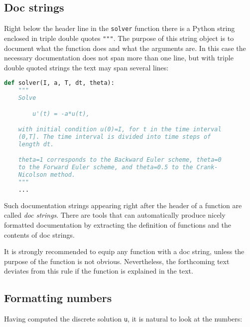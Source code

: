 \documentclass[graybox,sectrefs,envcountresetchap,open=right,final]{svmonodo}
\begin{document}
\subsection{Doc strings}


Right below the header line in the \texttt{solver} function there is a
Python string enclosed in triple double quotes \texttt{"""}.
The purpose of this string object is to document what the function
does and what the arguments are. In this case the necessary
documentation does not span more than one line, but with triple double
quoted strings the text may span several lines:

















\begin{lstlisting}[language=python,style=blue1_bluegreen]
def solver(I, a, T, dt, theta):
    """
    Solve

        u'(t) = -a*u(t),

    with initial condition u(0)=I, for t in the time interval
    (0,T]. The time interval is divided into time steps of
    length dt.

    theta=1 corresponds to the Backward Euler scheme, theta=0
    to the Forward Euler scheme, and theta=0.5 to the Crank-
    Nicolson method.
    """
    ...

\end{lstlisting}

Such documentation strings appearing right after the header of
a function are called \emph{doc strings}. There are tools that can automatically
produce nicely formatted documentation by extracting the definition of
functions and the contents of doc strings.

It is strongly recommended to equip any function with a doc string,
unless the purpose of the function
is not obvious. Nevertheless, the forthcoming
text deviates from this rule if the function is explained in the text.

\subsection{Formatting numbers}

Having computed the discrete solution \texttt{u}, it is natural to look at
the numbers:
\end{document}
